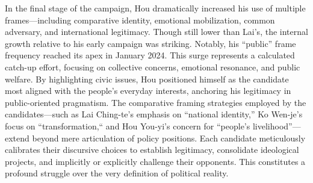 \documentclass[man,12pt]{apa7}
\begin{document}
In the final stage of the campaign, Hou dramatically increased his use of multiple frames—including comparative identity, emotional mobilization, common adversary, and international legitimacy. Though still lower than Lai's, the internal growth relative to his early campaign was striking. Notably, his ``public'' frame frequency reached its apex in January 2024. This surge represents a calculated catch-up effort, focusing on collective concerns, emotional resonance, and public welfare. By highlighting civic issues, Hou positioned himself as the candidate most aligned with the people's everyday interests, anchoring his legitimacy in public-oriented pragmatism.
The comparative framing strategies employed by the candidates—such as Lai Ching-te's emphasis on ``national identity,'' Ko Wen-je's focus on ``transformation,`` and Hou You-yi's concern for ``people's livelihood''—extend beyond mere articulation of policy positions. Each candidate meticulously calibrates their discursive choices to establish legitimacy, consolidate ideological projects, and implicitly or explicitly challenge their opponents. This constitutes a profound struggle over the very definition of political reality.
\end{document}
